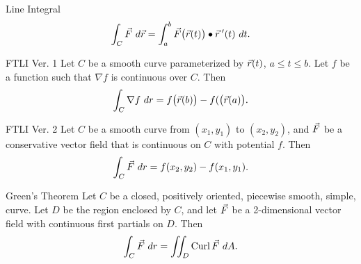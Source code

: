 \begin{definition}{Line Integral}
$$\int_C \vcF \ d\vcr=\int_a^b \vcF\big(\vcr(t)\big)\bullet\vcr\vprime(t)\ dt. $$
\end{definition}

\begin{theorem}{FTLI Ver. 1}
Let $C$ be a smooth curve parameterized by $\vec{r}(t)$, $a\leq t\leq b$. Let $f$ be a function such that $\nabla f$ is continuous over $C$. Then
$$\int_C \nabla f \ dr=f\big(\vcr(b)\big)-f(\big(\vcr(a)\big). $$
\end{theorem}

\begin{theorem}{FTLI Ver. 2}
Let $C$ be a smooth curve from $(x_1,y_1)$ to $(x_2,y_2)$, and $\vec{F}$ be a conservative vector field that is continuous on $C$ with potential $f$. Then $$\int_C \vcF \ dr=f(x_2,y_2)-f(x_1,y_1). $$ 
\end{theorem}

\begin{theorem}{Green's Theorem}
Let $C$ be a closed, positively oriented, piecewise smooth, simple, curve. Let $D$ be the region enclosed by $C$, and let $\vec{F}$ be a 2-dimensional vector field with continuous first partials on $D$. Then $$\int_C \vcF \ dr=\iint_D\curl \vcF\ dA.$$
\end{theorem}

\renewcommand\thesubsection{\thesection.\arabic{subsection}}